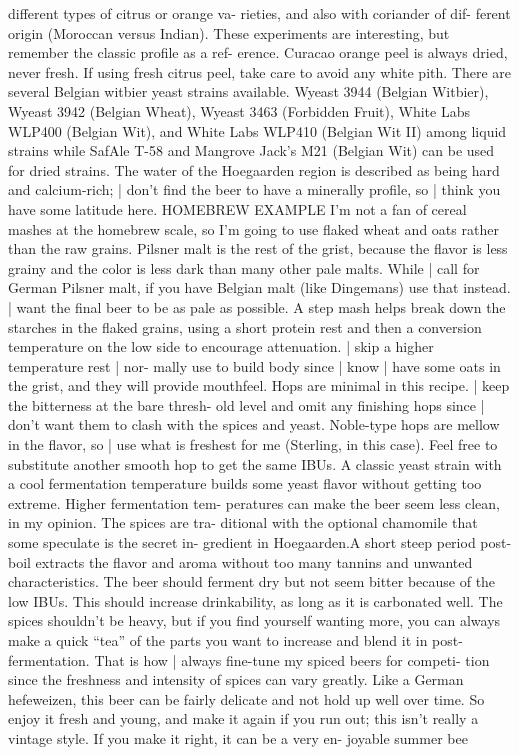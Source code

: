 \documentclass[a4paper,parskip=half]{scrartcl}
\begin{document}
\parencite[27]{Strong2021}
different types of citrus or orange va-
rieties, and also with coriander of dif-
ferent origin (Moroccan versus Indian).
These experiments are interesting, but
remember the classic profile as a ref-
erence. Curacao orange peel is always
dried, never fresh. If using fresh citrus
peel, take care to avoid any white pith.
There are several Belgian witbier
yeast strains available. Wyeast 3944
(Belgian Witbier), Wyeast 3942 (Belgian
Wheat), Wyeast 3463 (Forbidden Fruit),
White Labs WLP400 (Belgian Wit), and
White Labs WLP410 (Belgian Wit II)
among liquid strains while SafAle T-58
and Mangrove Jack's M21 (Belgian Wit)
can be used for dried strains. The water
of the Hoegaarden region is described
as being hard and calcium-rich; | don’t
find the beer to have a minerally profile,
so | think you have some latitude here.
HOMEBREW EXAMPLE
I’m not a fan of cereal mashes at the
homebrew scale, so I’m going to use
flaked wheat and oats rather than the
raw grains. Pilsner malt is the rest of
the grist, because the flavor is less
grainy and the color is less dark than
many other pale malts. While | call
for German Pilsner malt, if you have
Belgian malt (like Dingemans) use that
instead. | want the final beer to be as
pale as possible. A step mash helps
break down the starches in the flaked
grains, using a short protein rest and
then a conversion temperature on the
low side to encourage attenuation. |
skip a higher temperature rest | nor-
mally use to build body since | know |
have some oats in the grist, and they
will provide mouthfeel.
Hops are minimal in this recipe. |
keep the bitterness at the bare thresh-
old level and omit any finishing hops
since | don’t want them to clash with
the spices and yeast. Noble-type hops
are mellow in the flavor, so | use what
is freshest for me (Sterling, in this
case). Feel free to substitute another
smooth hop to get the same IBUs.
A classic yeast strain with a cool
fermentation temperature builds
some yeast flavor without getting too
extreme. Higher fermentation tem-
peratures can make the beer seem less
clean, in my opinion. The spices are tra-
ditional with the optional chamomile
that some speculate is the secret in-
gredient in Hoegaarden.A short steep
period post-boil extracts the flavor and
aroma without too many tannins and
unwanted characteristics.
The beer should ferment dry but
not seem bitter because of the low
IBUs. This should increase drinkability,
as long as it is carbonated well. The
spices shouldn't be heavy, but if you
find yourself wanting more, you can
always make a quick “tea” of the parts
you want to increase and blend it in
post-fermentation.
That is how | always
fine-tune my spiced beers for competi-
tion since the freshness and intensity
of spices can vary greatly.
Like a German
hefeweizen, this beer
can be fairly delicate and not hold up
well over time. So enjoy it fresh and
young, and make it again if you run
out; this isn’t really a vintage style. If
you make it right, it can be a very en-
joyable summer bee
\end{document}

